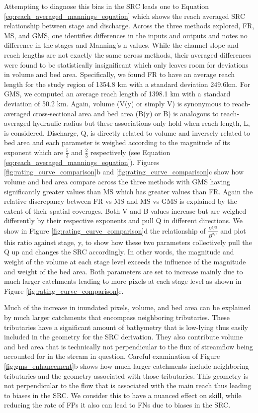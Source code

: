 \documentclass[draft]{dependencies/agujournal2019}
\begin{document}
Attempting to diagnose this bias in the SRC leads one to Equation \ref{eq:reach_averaged_mannings_equation} which shows the reach averaged SRC relationship between stage and discharge.
Across the three methods explored, FR, MS, and GMS, one identifies differences in the inputs and outputs and notes no difference in the stages and Manning's n values.
While the channel slope and reach lengths are not exactly the same across methods, their averaged differences were found to be statistically insignificant which only leaves room for deviations in volume and bed area.
Specifically, we found FR to have an average reach length for the study region of 1354.8 km with a standard deviation 249.6km.
For GMS, we computed an average reach length of 1398.1 km with a standard deviation of 50.2 km.
Again, volume (V(y) or simply V) is synonymous to reach-averaged cross-sectional area and bed area (B(y) or B) is analogous to reach-averaged hydraulic radius but these associations only hold when reach length, L, is considered.
Discharge, Q, is directly related to volume and inversely related to bed area and each parameter is weighed according to the magnitude of its exponent which are $\frac{5}{3}$ and $\frac{2}{3}$ respectively (see Equation \ref{eq:reach_averaged_mannings_equation}). 
Figures \ref{fig:rating_curve_comparison}b and \ref{fig:rating_curve_comparison}c show how volume and bed area compare across the three methods with GMS having significantly greater values than MS which has greater values than FR.
Again the relative discrepancy between FR vs MS and MS vs GMS is explained by the extent of their spatial coverages.
Both V and B values increase but are weighed differently by their respective exponents and pull Q in different directions.
We show in Figure \ref{fig:rating_curve_comparison}d the relationship of $\frac{V^{5/3}}{B^{2/3}}$ and plot this ratio against stage, y, to show how these two parameters collectively pull the Q up and changes the SRC accordingly.
In other words, the magnitude and weight of the volume at each stage level exceeds the influence of the magnitude and weight of the bed area.
Both parameters are set to increase mainly due to much larger catchments leading to more pixels at each stage level as shown in Figure \ref{fig:rating_curve_comparison}e.

Much of the increase in inundated pixels, volume, and bed area can be explained by much larger catchments that encompass neighboring tributaries.
These tributaries have a significant amount of bathymetry that is low-lying thus easily included in the geometry for the SRC derivation. 
They also contribute volume and bed area that is technically not perpendicular to the flux of streamflow being accounted for in the stream in question. 
Careful examination of Figure \ref{fig:gms_enhancement}b shows how much larger catchments include neighboring tributaries and the geometry associated with those tributaries. 
This geometry is not perpendicular to the flow that is associated with the main reach thus leading to biases in the SRC.
We consider this to have a nuanced effect on skill, while reducing the rate of FPs it also can lead to FNs due to biases in the SRC.
\end{document}
